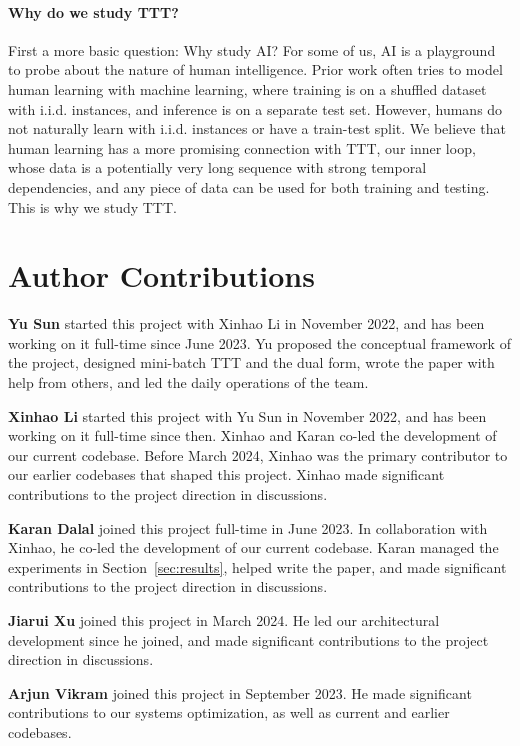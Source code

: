 \documentclass{article}
\begin{document}
\paragraph{Why do we study TTT?} First a more basic question: Why study AI? For some of us, AI is a playground to probe about the nature of human intelligence. 
Prior work often tries to model human learning with machine learning, where training is on a shuffled dataset with i.i.d. instances, and inference is on a separate test set. 
However, humans do not naturally learn with i.i.d. instances or have a train-test split.
We believe that human learning has a more promising connection with TTT, our inner loop, whose data is a potentially very long sequence with strong temporal dependencies, and any piece of data can be used for both training and testing. This is why we study TTT.

\clearpage

\section*{Author Contributions}
\label{app:authors}

\textbf{Yu Sun} started this project with Xinhao Li in November 2022, and has been working on it full-time since June 2023.
Yu proposed the conceptual framework of the project, designed mini-batch TTT and the dual form, wrote the paper with help from others, and led the daily operations of the team.

\textbf{Xinhao Li} started this project with Yu Sun in November 2022, and has been working on it full-time since then.
Xinhao and Karan co-led the development of our current codebase.
Before March 2024, Xinhao was the primary contributor to our earlier codebases that shaped this project.
Xinhao made significant contributions to the project direction in discussions.

\textbf{Karan Dalal} joined this project full-time in June 2023.
In collaboration with Xinhao, he co-led the development of our current codebase.
Karan managed the experiments in Section~\ref{sec:results}, helped write the paper, and made significant contributions to the project direction in discussions.

\textbf{Jiarui Xu} joined this project in March 2024. He led our architectural development since he joined, and made significant contributions to the project direction in discussions.

\textbf{Arjun Vikram} joined this project in September 2023. He made significant contributions to our systems optimization, as well as current and earlier codebases.
\end{document}
